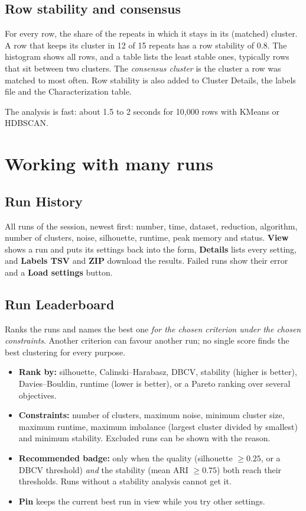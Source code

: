 \documentclass[11pt,a4paper]{article}
\newcommand{\ui}[1]{\textsf{\textbf{#1}}}   %
\begin{document}
\subsection{Row stability and consensus}

For every row, the share of the repeats in which it stays in its (matched) cluster. A row that keeps its cluster in
12 of 15 repeats has a row stability of 0.8. The histogram shows all rows, and a table lists the least stable ones,
typically rows that sit between two clusters. The \emph{consensus cluster} is the cluster a row was matched to most
often. Row stability is also added to Cluster Details, the labels file and the Characterization table.

The analysis is fast: about 1.5 to 2 seconds for 10{,}000 rows with KMeans or HDBSCAN.

\section{Working with many runs}

\subsection{Run History}

All runs of the session, newest first: number, time, dataset, reduction, algorithm, number of clusters, noise,
silhouette, runtime, peak memory and status. \ui{View} shows a run and puts its settings back into the form,
\ui{Details} lists every setting, and \ui{Labels TSV} and \ui{ZIP} download the results. Failed runs show their error
and a \ui{Load settings} button.

\subsection{Run Leaderboard}

Ranks the runs and names the best one \emph{for the chosen criterion under the chosen constraints}. Another criterion
can favour another run; no single score finds the best clustering for every purpose.

\begin{itemize}
  \item \textbf{Rank by:} silhouette, Calinski--Harabasz, DBCV, stability (higher is better), Davies--Bouldin,
    runtime (lower is better), or a Pareto ranking over several objectives.
  \item \textbf{Constraints:} number of clusters, maximum noise, minimum cluster size, maximum runtime, maximum
    imbalance (largest cluster divided by smallest) and minimum stability. Excluded runs can be shown with the reason.
  \item \textbf{Recommended badge:} only when the quality (silhouette $\ge 0.25$, or a DBCV threshold) \emph{and} the
    stability (mean ARI $\ge 0.75$) both reach their thresholds. Runs without a stability analysis cannot get it.
  \item \textbf{Pin} keeps the current best run in view while you try other settings.
\end{itemize}
\end{document}

